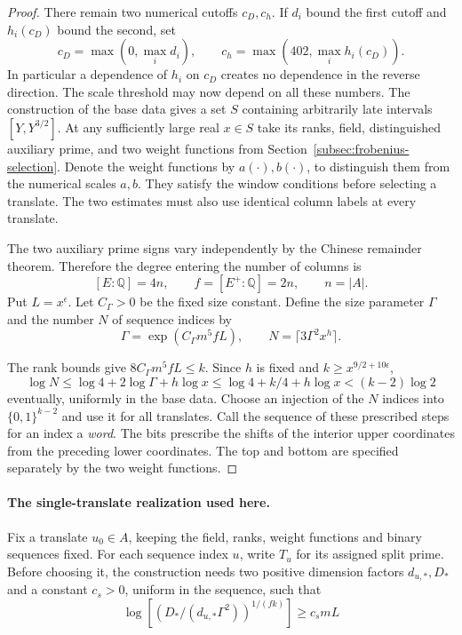 \begin{proof}
There remain two numerical cutoffs \(c_D,c_h\).
If \(d_i\) bound the first cutoff and \(h_i(c_D)\) bound the
second, set
\[
 c_D=\max(0,\max_i d_i),\qquad
 c_h=\max(402,\max_i h_i(c_D)).
\]
In particular a dependence of \(h_i\) on \(c_D\) creates no
dependence in the reverse direction. The scale threshold may now depend on all these
numbers. The construction of the base data gives a set
\(S\) containing arbitrarily late intervals
\([Y,Y^{3/2}]\). At any sufficiently large real \(x\in S\)
take its ranks, field, distinguished auxiliary prime, and
two weight functions from Section~\ref{subsec:frobenius-selection}.
Denote the weight functions by \(a(\cdot),b(\cdot)\), to
distinguish them from the numerical scales \(a,b\). They
satisfy the window conditions before selecting a translate.
The two estimates must also use identical column labels at every translate.

The two auxiliary prime signs vary independently by the Chinese
remainder theorem. Therefore the degree entering the number of columns is
\[
 [E:\mathbb Q]=4n,\qquad f=[E^+:\mathbb Q]=2n,\qquad n=|A|.
\]
Put \(L=x^\epsilon\). Let \(C_\Gamma>0\) be the fixed size
constant. Define the size parameter \(\Gamma\) and the
number \(N\) of sequence indices by
\[
 \Gamma=\exp(C_\Gamma m^5fL),\qquad
 N=\lceil 3\Gamma^2x^h\rceil .
\]

The rank bounds give \(8C_\Gamma m^5 f L\le k\). Since
\(h\) is fixed and \(k\ge x^{9/2+10\epsilon}\),
\[
 \log N\le\log4+2\log\Gamma+h\log x
       \le \log4+k/4+h\log x < (k-2)\log 2
\]
eventually, uniformly in the base data. Choose an injection
of the \(N\) indices into \(\{0,1\}^{k-2}\) and use it for
all translates. Call the sequence of these prescribed steps for an index a
\emph{word}. The bits prescribe the shifts of the interior
upper coordinates from the preceding lower coordinates. The top and bottom are
specified separately by the two weight functions.
\end{proof}

\paragraph{The single-translate realization used here.}
Fix a translate \(u_0\in A\), keeping the
field, ranks, weight functions and binary sequences fixed.
For each sequence index \(u\), write \(T_u\) for its assigned
split prime. Before choosing it, the construction needs two
positive dimension factors \(d_{u,*},D_*\) and a constant
\(c_s>0\), uniform in the sequence, such that
\[
  \log\!\left[\left(D_*/(d_{u,*}\Gamma^2)\right)^{1/(fk)}\right]
      \ge c_s mL
\]

